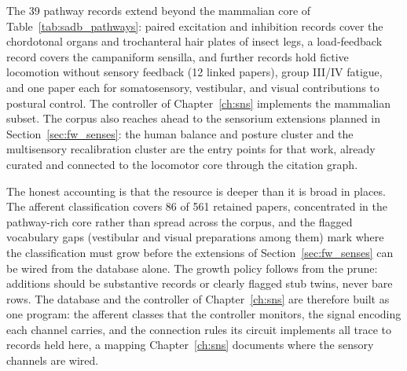 The 39 pathway records extend beyond the mammalian core of Table~\ref{tab:sadb_pathways}: paired excitation and inhibition records cover the chordotonal organs and trochanteral hair plates of insect legs, a load-feedback record covers the campaniform sensilla, and further records hold fictive locomotion without sensory feedback (12 linked papers), group III/IV fatigue, and one paper each for somatosensory, vestibular, and visual contributions to postural control. The controller of Chapter~\ref{ch:sns} implements the mammalian subset. The corpus also reaches ahead to the sensorium extensions planned in Section~\ref{sec:fw_senses}: the human balance and posture cluster and the multisensory recalibration cluster are the entry points for that work, already curated and connected to the locomotor core through the citation graph.

The honest accounting is that the resource is deeper than it is broad in places. The afferent classification covers 86 of 561 retained papers, concentrated in the pathway-rich core rather than spread across the corpus, and the flagged vocabulary gaps (vestibular and visual preparations among them) mark where the classification must grow before the extensions of Section~\ref{sec:fw_senses} can be wired from the database alone. The growth policy follows from the prune: additions should be substantive records or clearly flagged stub twins, never bare rows. The database and the controller of Chapter~\ref{ch:sns} are therefore built as one program: the afferent classes that the controller monitors, the signal encoding each channel carries, and the connection rules its circuit implements all trace to records held here, a mapping Chapter~\ref{ch:sns} documents where the sensory channels are wired.
